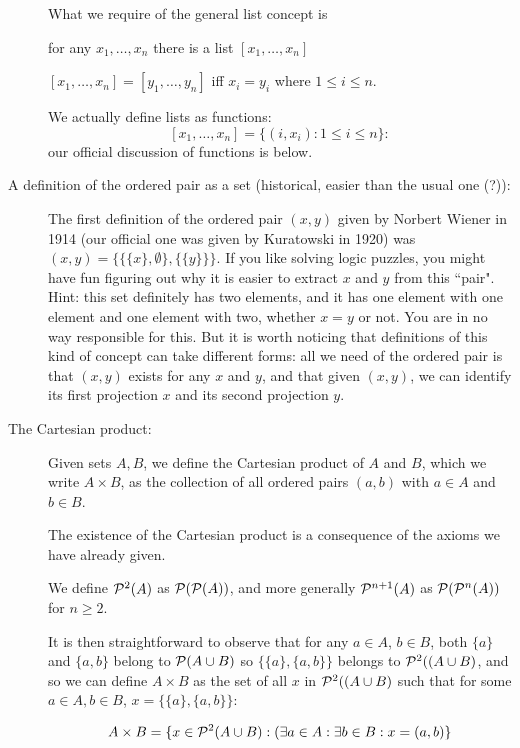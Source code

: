 \documentclass[12pt]{article}
\begin{document}
\begin{description}
What we require of the general list concept is

for any $x_1,\ldots,x_n$ there is a list $[x_1,\ldots,x_n]$

$[x_1,\ldots,x_n] = [y_1,\ldots,y_n]$ iff $x_i = y_i$ where $1 \leq i \leq n$.

We actually define lists as functions:  $$[x_1,\ldots,x_n] = \{(i,x_i):1 \leq i \leq n\}:$$ our official discussion of functions is below.

\item[A definition of the ordered pair as a set (historical, easier than the usual one (?)):]

The first definition of the ordered pair $(x,y)$ given by Norbert Wiener in 1914 (our official one was given by Kuratowski in 1920) was $(x,y) = \{\{\{x\},\emptyset\},\{\{y\}\}\}$.  If you like solving logic puzzles, you might have fun figuring out why it is easier to extract $x$ and $y$ from this ``pair".  Hint:  this set definitely has two elements, and it has one element with one element and one element with two, whether $x=y$ or not.  You are in no way responsible for this.  But it is worth noticing that definitions of this kind of concept can take different forms:  all we need of the ordered pair is that $(x,y)$ exists for any $x$ and $y$, and that given $(x,y)$, we can identify its first projection $x$ and its second projection $y$.



\item[The Cartesian product:]

Given sets $A,B$, we define the Cartesian product of $A$ and $B$, which we write $A \times B$,  as the collection of all ordered pairs
$(a,b)$ with $a \in A$ and $b \in B$.

The existence of the Cartesian product is a consequence of the axioms we have already given.

We define ${\cal P}^2(A)$ as ${\cal P}({\cal P}(A))$, and more generally ${\cal P}^{n+1}(A)$ as 
${\cal P}({\cal P}^n(A))$ for $n \geq 2$.

It is then straightforward to observe that for any $a \in A$, $b \in B$, both $\{a\}$ and $\{a,b\}$ belong to ${\cal P}(A \cup B)$ so $\{\{a\},\{a,b\}\}$ belongs to ${\cal P}^2((A \cup B)$, and so we can define $A \times B$ as the set of all $x$ in ${\cal P}^2((A \cup B)$ such that for some $a\in A, b\in B$, $x = \{\{a\},\{a,b\}\}$:

$$A \times B = \{x \in {\cal P}^2(A \cup B):(\exists a \in A:\exists b \in B:x=(a,b)\}$$


\end{description}
\end{document}
